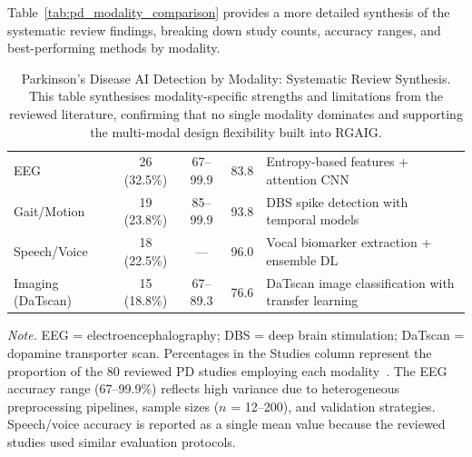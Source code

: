 Table~\ref{tab:pd_modality_comparison} provides a more detailed synthesis of the systematic review findings, breaking down study counts, accuracy ranges, and best-performing methods by modality.

\begin{table}[H]
\tablefontsize
\tablestripes\tablefontsize
\caption[Parkinson's Disease AI Detection by Modality: Systematic]{Parkinson's Disease AI Detection by Modality: Systematic Review Synthesis. This table synthesises modality-specific strengths and limitations from the reviewed literature, confirming that no single modality dominates and supporting the multi-modal design flexibility built into RGAIG.}
\begin{tabularx}{\textwidth}{@{} >{\raggedright\arraybackslash}p{2.3cm} c c c L @{}}
\toprule
{} &  &  &  &  \\
\midrule
EEG & 26 (32.5\%) & 67--99.9 & 83.8 & Entropy-based features + attention CNN \\
\addlinespace
Gait/Motion & 19 (23.8\%) & 85--99.9 & 93.8 & DBS spike detection with temporal models \\
\addlinespace
Speech/Voice & 18 (22.5\%) & --- & 96.0 & Vocal biomarker extraction + ensemble DL \\
\addlinespace
Imaging (DaTscan) & 15 (18.8\%) & 67--89.3 & 76.6 & DaTscan image classification with transfer learning \\
\bottomrule
\end{tabularx}
\vspace{0.5em}\noindent\textit{Note.} EEG = electroencephalography; DBS = deep brain stimulation; DaTscan = dopamine transporter scan. Percentages in the Studies column represent the proportion of the 80 reviewed PD studies employing each modality~\cite{asthana2025pd}. The EEG accuracy range (67--99.9\%) reflects high variance due to heterogeneous preprocessing pipelines, sample sizes ($n$ = 12--200), and validation strategies. Speech/voice accuracy is reported as a single mean value because the reviewed studies used similar evaluation protocols.
\end{table}

